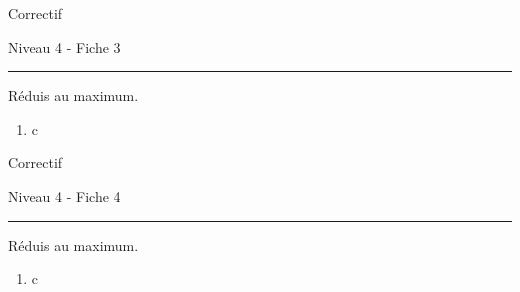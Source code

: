 \newpage
\begin{center}
  \bfseries
  \begin{Huge}
    Correctif
  \end{Huge}
  \smallbreak
  \begin{large}
    Niveau 4  - Fiche 3
  \end{large}
  \smallbreak
  \rule[10pt]{.5\linewidth}{1 pt}
\end{center}

\setcounter{exercise}{0}

\begin{exercise}
  Réduis au maximum.
  \begin{enumerate}[cols=3]

    \item c
    
  \end{enumerate}
\end{exercise}


\newpage
\begin{center}
  \bfseries
  \begin{Huge}
    Correctif
  \end{Huge}
  \smallbreak
  \begin{large}
    Niveau 4   - Fiche 4
  \end{large}
  \smallbreak
  \rule[10pt]{.5\linewidth}{1 pt}
\end{center}

\setcounter{exercise}{0}

\begin{exercise}
  Réduis au maximum. 
  \begin{enumerate}[cols=3]
    \item c
    
  \end{enumerate}
\end{exercise}


